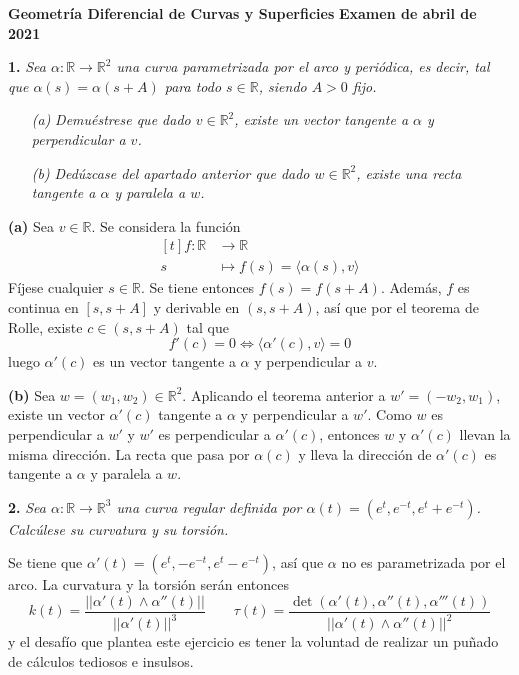 \documentclass[12pt]{report}
\newcommand{\R}{\mathbb R}
\begin{document}
\small

\textbf{Geometría Diferencial de Curvas y Superficies} \hfill \textbf{Examen de abril de 2021}
\linebreak

\textbf{1. } \textit{Sea $\alpha \colon \R \to \R^2$ una curva parametrizada por el arco y periódica, es decir, tal que $\alpha(s) = \alpha(s+A)$ para todo $s \in \R$, siendo $A >0$ fijo. }

\begin{itemize}
    \item[\textit{(a)}] \textit{Demuéstrese que dado $v \in \R^2$, existe un vector tangente a $\alpha$ y perpendicular a $v$.}
    \item[\textit{(b)}] \textit{Dedúzcase del apartado anterior que dado $w \in \R^2$, existe una recta tangente a $\alpha$ y paralela a $w$.}
\end{itemize}

\textbf{(a) } Sea $v \in \R$. Se considera la función
\[\begin{aligned}[t]
    f \colon \R &\longrightarrow \R \\
    s &\longmapsto f(s) = \langle \alpha(s),v \rangle
\end{aligned}\]
Fíjese cualquier $s \in \R$. Se tiene entonces $f(s) = f(s+A)$. Además, $f$ es continua en $[s,s+A]$ y derivable en $(s,s+A)$, así que por el teorema de Rolle, existe $c \in (s,s+A)$ tal que 
\[f'(c) = 0 \iff \langle \alpha'(c),v \rangle = 0\]
luego $\alpha'(c)$ es un vector tangente a $\alpha$ y perpendicular a $v$.

\vspace{2mm}
\textbf{(b) } Sea $w = (w_1,w_2) \in \R^2$. Aplicando el teorema anterior a $w' = (-w_2,w_1)$, existe un vector $\alpha'(c)$ tangente a $\alpha$ y perpendicular a $w'$. Como $w$ es perpendicular a $w'$ y $w'$ es perpendicular a $\alpha'(c)$, entonces $w$ y $\alpha'(c)$ llevan la misma dirección. La recta que pasa por $\alpha(c)$ y lleva la dirección de $\alpha'(c)$ es tangente a $\alpha$ y paralela a $w$.

\vspace{4mm}
\textbf{2. } \textit{Sea $\alpha \colon \R \to \R^3$ una curva regular definida por $\alpha(t) =(e^t,e^{-t},e^t+e^{-t})$. Calcúlese su curvatura y su torsión. }

\vspace{2mm}
Se tiene que $\alpha'(t) = (e^t,-e^{-t},e^t-e^{-t})$, así que $\alpha$ no es parametrizada por el arco. La curvatura y la torsión serán entonces
\[k(t) = \frac{||\alpha'(t) \wedge \alpha''(t)||}{||\alpha'(t)||^3} \qquad \tau(t) = \frac{\det(\alpha'(t),\alpha''(t),\alpha'''(t))}{||\alpha'(t) \wedge \alpha''(t)||^2}\]
y el desafío que plantea este ejercicio es tener la voluntad de realizar un puñado de cálculos tediosos e insulsos.
\end{document}
